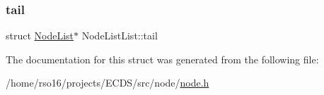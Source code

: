 \mbox{\label{structNodeListList_ae7650fb01beef0709a3156efb1d4b956}} 
\subsubsection{\texorpdfstring{tail}{tail}}
{\footnotesize\ttfamily struct \hyperlink{structNodeList}{Node\+List}$\ast$ Node\+List\+List\+::tail}



The documentation for this struct was generated from the following file\+:\begin{DoxyCompactItemize}
\item 
/home/rso16/projects/\+E\+C\+D\+S/src/node/\hyperlink{node_8h}{node.\+h}\end{DoxyCompactItemize}
